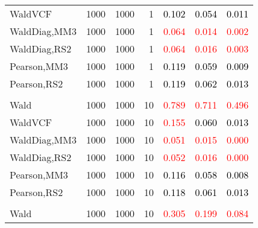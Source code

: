 \documentclass[
]{article}
\begin{document}
\begin{table}[H]
{\begin{tabular}[t]{lrrrrrr}
\hspace{1em}WaldVCF & 1000 & 1000 & 1 & \textcolor{black}{0.102} & \textcolor{black}{0.054} & \textcolor{black}{0.011}\\
\hspace{1em}WaldDiag,MM3 & 1000 & 1000 & 1 & \textcolor{red}{0.064} & \textcolor{red}{0.014} & \textcolor{red}{0.002}\\
\hspace{1em}WaldDiag,RS2 & 1000 & 1000 & 1 & \textcolor{red}{0.064} & \textcolor{red}{0.016} & \textcolor{red}{0.003}\\
\hspace{1em}Pearson,MM3 & 1000 & 1000 & 1 & \textcolor{black}{0.119} & \textcolor{black}{0.059} & \textcolor{black}{0.009}\\
\hspace{1em}Pearson,RS2 & 1000 & 1000 & 1 & \textcolor{black}{0.119} & \textcolor{black}{0.062} & \textcolor{black}{0.013}\\
\addlinespace[0.3em]
\multicolumn{7}{l}{\textbf{1F 15V}}\\
\hspace{1em}Wald & 1000 & 1000 & 10 & \textcolor{red}{0.789} & \textcolor{red}{0.711} & \textcolor{red}{0.496}\\
\hspace{1em}WaldVCF & 1000 & 1000 & 10 & \textcolor{red}{0.155} & \textcolor{black}{0.060} & \textcolor{black}{0.013}\\
\hspace{1em}WaldDiag,MM3 & 1000 & 1000 & 10 & \textcolor{red}{0.051} & \textcolor{red}{0.015} & \textcolor{red}{0.000}\\
\hspace{1em}WaldDiag,RS2 & 1000 & 1000 & 10 & \textcolor{red}{0.052} & \textcolor{red}{0.016} & \textcolor{red}{0.000}\\
\hspace{1em}Pearson,MM3 & 1000 & 1000 & 10 & \textcolor{black}{0.116} & \textcolor{black}{0.058} & \textcolor{black}{0.008}\\
\hspace{1em}Pearson,RS2 & 1000 & 1000 & 10 & \textcolor{black}{0.118} & \textcolor{black}{0.061} & \textcolor{black}{0.013}\\
\addlinespace[0.3em]
\multicolumn{7}{l}{\textbf{2F 10V}}\\
\hspace{1em}Wald & 1000 & 1000 & 10 & \textcolor{red}{0.305} & \textcolor{red}{0.199} & \textcolor{red}{0.084}\\

\end{tabular}}
\end{table}
\end{document}
